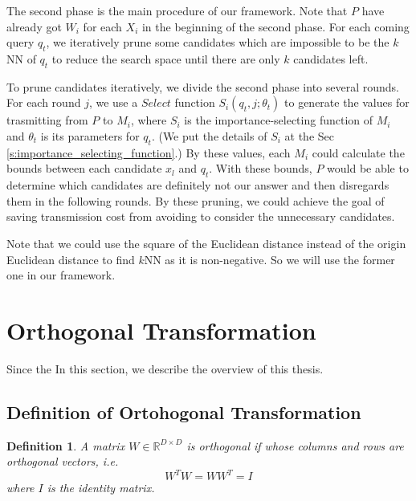 The second phase is the main procedure of our framework.  Note that $P$ have already got $W_i$ for each $X_i$ in the beginning of the second phase. For each coming query $q_t$, we iteratively prune some candidates which are impossible to be the $k$NN of $q_t$ to reduce the search space until there are only $k$ candidates left.

To prune candidates iteratively, we divide the second phase into several rounds.  For each round $j$, we use a $Select$ function $S_i(q_t,j;\theta_t)$ to generate the values for trasmitting from $P$ to $M_i$, where $S_i$ is the importance-selecting function of $M_i$ and $\theta_t$ is its parameters for $q_t$.  (We put the details of $S_i$ at the Sec \ref{s:importance_selecting_function}.)  By these values, each $M_i$ could calculate the bounds between each candidate $x_l$ and $q_t$.  With these bounds, $P$ would be able to determine which candidates are definitely not our answer and then disregards them in the following rounds.  By these pruning, we could achieve the goal of saving transmission cost from avoiding to consider the unnecessary candidates.

Note that we could use the square of the Euclidean distance instead of the origin Euclidean distance to find $k$NN as it is non-negative.  So we will use the former one in our framework.

\section{Orthogonal Transformation}
\label{s:orthogonal}
Since the In this section, we describe the overview of this thesis.

\subsection{Definition of Ortohogonal Transformation}
\label{ss:ortho_def}
\newtheorem{Orthogonal}{\bf Definition}
\begin{Orthogonal}
A matrix $W \in\mathbb{R}^{D\times D}$ is orthogonal if whose columns and rows are orthogonal vectors, i.e.
\[
W^{T}W=WW^{T}=I
\]
where $I$ is the identity matrix.
\end{Orthogonal}

